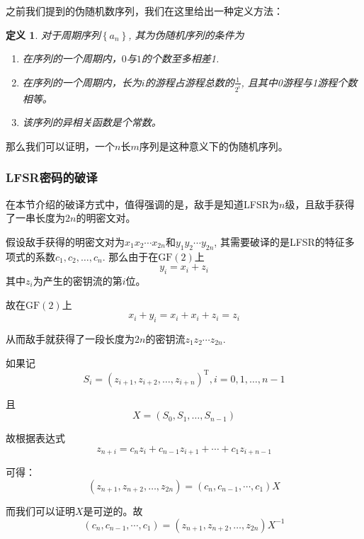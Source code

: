 \documentclass[UTF8]{ctexrep}
\newcommand{\ext}{\displaystyle}
\def\pth#1{\left( {#1}\right)}
\def\brace#1{\left\{ {#1} \right\}}
\def\GF{\mathrm{GF}}
\newtheorem{Definition}{\hspace{2em}定义}[chapter]
\begin{document}
之前我们提到的伪随机数序列，我们在这里给出一种定义方法：
\begin{Definition}
对于周期序列$\brace{a_n}$, 其为伪随机序列的条件为
\begin{enumerate}
    \item 在序列的一个周期内，$0$与$1$的个数至多相差1.
    \item 在序列的一个周期内，长为$i$的游程占游程总数的$\ext\frac{1}{2^i}$, 且其中0游程与1游程个数相等。
    \item 该序列的异相关函数是个常数。
\end{enumerate}
\end{Definition}

那么我们可以证明，一个$n$长$m$序列是这种意义下的伪随机序列。
\subsubsection{LFSR密码的破译}
在本节介绍的破译方式中，值得强调的是，敌手是知道LFSR为$n$级，且敌手获得了一串长度为$2n$的明密文对。\par
假设敌手获得的明密文对为$x_1x_2\cdots x_{2n}$和$y_1y_2\cdots y_{2n}$, 其需要破译的是LFSR的特征多项式的系数$c_1, c_2,\ldots, c_n$. 那么由于在$\GF\pth{2}$上
\[y_i=x_i+z_i\]
其中$z_i$为产生的密钥流的第$i$位。\par
故在$\GF\pth{2}$上
\[x_i+y_i=x_i+x_i+z_i=z_i\]

从而敌手就获得了一段长度为$2n$的密钥流$z_1z_2\cdots z_{2n}$.\par
如果记
\begin{equation}
    S_i=\pth{z_{i+1}, z_{i+2}, \ldots, z_{i+n}}^{\mathrm{T}}, i=0, 1,\ldots, n-1
\end{equation}

且
\begin{equation}
    X=\pth{S_0,S_1,\ldots, S_{n-1}}
\end{equation}

故根据表达式
\begin{equation}
    z_{n+i}=c_nz_{i}+c_{n-1}z_{i+1}+\cdots +c_{1}z_{i+n-1}
\end{equation}

可得：
\begin{equation}
    \pth{z_{n+1}, z_{n+2},\ldots, z_{2n}}=\pth{c_n, c_{n-1}, \cdots ,c_{1}}X
\end{equation}

而我们可以证明$X$是可逆的。故
\begin{equation}
    \pth{c_n, c_{n-1}, \cdots ,c_{1}}=\pth{z_{n+1}, z_{n+2},\ldots, z_{2n}}X^{-1}
\end{equation}
\end{document}
